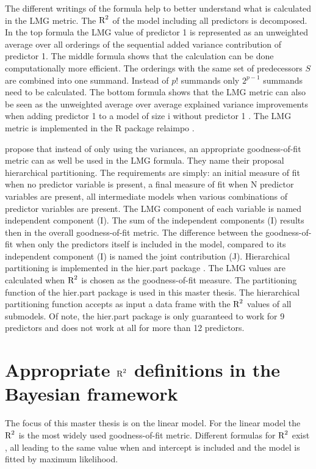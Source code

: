 \documentclass[11pt,a4paper,twoside]{book}\usepackage[]{graphicx}\usepackage[]{color}
\begin{document}
   The different writings of the formula help to better understand what is calculated in the LMG metric. The $\text{R}^2$ of the model including all predictors is decomposed. In the top formula the LMG value of predictor 1 is represented as an unweighted average over all orderings of the sequential added variance contribution of predictor 1. The middle formula shows that the calculation can be  done computationally more efficient. The orderings with the same set of predecessors $S$ are combined into one summand. Instead of $p!$ summands only $2^{p-1}$ summands need to be calculated. The bottom formula shows that the LMG metric can also be seen as the unweighted average over average explained variance improvements when adding predictor 1 to a model of size i without predictor 1 \citep{Gromping2015}. The LMG metric is implemented in the R package relaimpo \citep{Gromping2006}.
   
\cite{Chevan1991} propose that instead of only using the variances, an appropriate goodness-of-fit metric can as well be used in the LMG formula. They name their proposal hierarchical partitioning. The requirements are simply: an initial measure of fit when no predictor variable is present, a final measure of fit when N predictor variables are present, all intermediate models when various combinations of predictor variables are present. 
  The LMG component of each variable is named independent component (I). The sum of the independent components (I) results then in the overall goodness-of-fit metric. The difference between the goodness-of-fit when only the predictors itself is included in the model, compared to its independent component (I) is named the joint contribution (J). Hierarchical partitioning is implemented in the hier.part package \citep{Walsh2015}. The LMG values are calculated when  $\text{R}^2$ is chosen as the goodness-of-fit measure.  The partitioning function of the hier.part package is used in this master thesis. The hierarchical partitioning function accepts as input a data frame with the $\text{R}^2$ values of all submodels. Of note,  the hier.part package is only guaranteed to work for 9 predictors and does not work at all for more than 12 predictors.
  
\section{ Appropriate $\text{R}^2$ definitions in the Bayesian framework}
The focus of this master thesis is on the linear model. For the linear model the $\text{R}^2$ is the most widely used goodness-of-fit metric.  Different formulas for $\text{R}^2$ exist \cite{Kvalseth1985}, all leading to the same value when and intercept is included and the model is fitted by maximum likelihood. 
\end{document}
